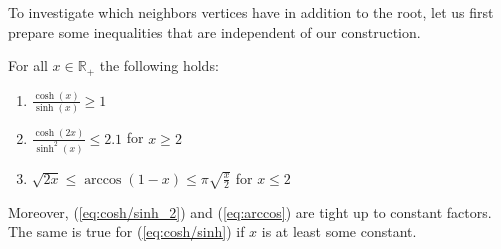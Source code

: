 %
To investigate which neighbors vertices have in addition to the root, let us first prepare some inequalities that are independent of our construction.
%
\begin{lemma}\label{lem:hyp-ineq}
    \newlength{\extraspace}
    \setlength{\extraspace}{0.3em}
    For all $ x \in \mathbb{R}_+ $ the following holds:
    \vspace{\extraspace / 2}
    \begin{enumerate}[label={(\arabic*)}]
        \setlength{\itemsep}{\extraspace}
        \item \label{eq:cosh/sinh}
            $ \frac{\cosh(x)}{\sinh(x)} \geq 1 $
        \item \label{eq:cosh/sinh_2}
            $ \frac{\cosh(2x)}{\sinh^2(x)} \leq 2.1 $ for $ x \geq 2 $
        \item \label{eq:arccos}
            $ \sqrt{2x} \leq \arccos(1-x) \leq \pi \sqrt{\frac{x}{2}} $ for $ x \leq 2 $
        \end{enumerate} \vspace{\extraspace / 2} Moreover, (\ref{eq:cosh/sinh_2}) and (\ref{eq:arccos}) are tight up to constant factors.
        The same is true for (\ref{eq:cosh/sinh}) if $x$ is at least some constant.
\end{lemma}
%
